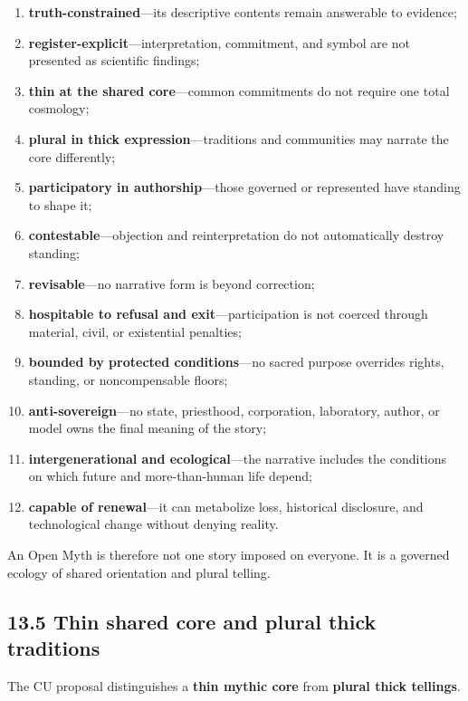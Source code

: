 \documentclass[
  11pt,
]{article}
\providecommand{\tightlist}{%
  \setlength{\itemsep}{0pt}\setlength{\parskip}{0pt}}
\begin{document}
\begin{enumerate}
\def\labelenumi{\arabic{enumi}.}
\tightlist
\item
  \textbf{truth-constrained}---its descriptive contents remain
  answerable to evidence;
\item
  \textbf{register-explicit}---interpretation, commitment, and symbol
  are not presented as scientific findings;
\item
  \textbf{thin at the shared core}---common commitments do not require
  one total cosmology;
\item
  \textbf{plural in thick expression}---traditions and communities may
  narrate the core differently;
\item
  \textbf{participatory in authorship}---those governed or represented
  have standing to shape it;
\item
  \textbf{contestable}---objection and reinterpretation do not
  automatically destroy standing;
\item
  \textbf{revisable}---no narrative form is beyond correction;
\item
  \textbf{hospitable to refusal and exit}---participation is not coerced
  through material, civil, or existential penalties;
\item
  \textbf{bounded by protected conditions}---no sacred purpose overrides
  rights, standing, or noncompensable floors;
\item
  \textbf{anti-sovereign}---no state, priesthood, corporation,
  laboratory, author, or model owns the final meaning of the story;
\item
  \textbf{intergenerational and ecological}---the narrative includes the
  conditions on which future and more-than-human life depend;
\item
  \textbf{capable of renewal}---it can metabolize loss, historical
  disclosure, and technological change without denying reality.
\end{enumerate}

An Open Myth is therefore not one story imposed on everyone. It is a
governed ecology of shared orientation and plural telling.

\subsection{13.5 Thin shared core and plural thick
traditions}\label{thin-shared-core-and-plural-thick-traditions}

The CU proposal distinguishes a \textbf{thin mythic core} from
\textbf{plural thick tellings}.
\end{document}

